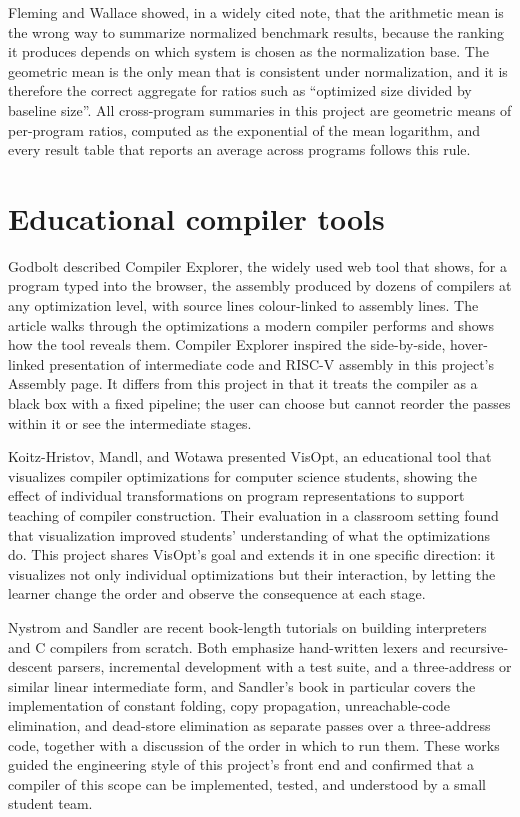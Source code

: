 Fleming and Wallace \cite{fleming1986} showed, in a widely cited note, that the arithmetic mean is the wrong way to summarize normalized benchmark results, because the ranking it produces depends on which system is chosen as the normalization base. The geometric mean is the only mean that is consistent under normalization, and it is therefore the correct aggregate for ratios such as ``optimized size divided by baseline size''. All cross-program summaries in this project are geometric means of per-program ratios, computed as the exponential of the mean logarithm, and every result table that reports an average across programs follows this rule.

\section*{Educational compiler tools}

Godbolt \cite{godbolt2019} described Compiler Explorer, the widely used web tool that shows, for a program typed into the browser, the assembly produced by dozens of compilers at any optimization level, with source lines colour-linked to assembly lines. The article walks through the optimizations a modern compiler performs and shows how the tool reveals them. Compiler Explorer inspired the side-by-side, hover-linked presentation of intermediate code and RISC-V assembly in this project's Assembly page. It differs from this project in that it treats the compiler as a black box with a fixed pipeline; the user can choose  but cannot reorder the passes within it or see the intermediate stages.

Koitz-Hristov, Mandl, and Wotawa \cite{koitz2025} presented VisOpt, an educational tool that visualizes compiler optimizations for computer science students, showing the effect of individual transformations on program representations to support teaching of compiler construction. Their evaluation in a classroom setting found that visualization improved students' understanding of what the optimizations do. This project shares VisOpt's goal and extends it in one specific direction: it visualizes not only individual optimizations but their interaction, by letting the learner change the order and observe the consequence at each stage.

Nystrom \cite{nystrom2021} and Sandler \cite{sandler2024} are recent book-length tutorials on building interpreters and C compilers from scratch. Both emphasize hand-written lexers and recursive-descent parsers, incremental development with a test suite, and a three-address or similar linear intermediate form, and Sandler's book in particular covers the implementation of constant folding, copy propagation, unreachable-code elimination, and dead-store elimination as separate passes over a three-address code, together with a discussion of the order in which to run them. These works guided the engineering style of this project's front end and confirmed that a compiler of this scope can be implemented, tested, and understood by a small student team.

